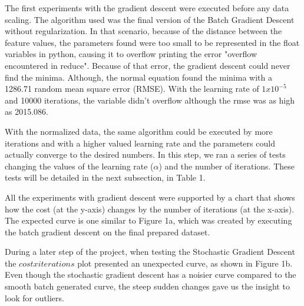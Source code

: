 \documentclass[conference]{IEEEtran}
\begin{document}
    The first experiments with the gradient descent were executed before any data scaling. The algorithm used was the final version of the Batch Gradient Descent without regularization. In that scenario, because of the distance between the feature values, the parameters found were too small to be represented in the float variables in python, causing it to overflow printing the error "overflow encountered in reduce". Because of that error, the gradient descent could never find the minima. Although, the normal equation found the minima with a 1286.71 random mean square error (RMSE). With the learning rate of $1x10^{-5}$ and 10000 iterations, the variable didn't overflow although the rmse was as high as 2015.086.
    
    With the normalized data, the same algorithm could be executed by more iterations and with a higher valued learning rate and the parameters could actually converge to the desired numbers. In this step, we ran a series of tests changing the values of the learning rate ($\alpha$) and the number of iterations. These tests will be detailed in the next subsection, in Table 1.
    
    All the experiments with gradient descent were supported by a chart that shows how the cost (at the y-axis) changes by the number of iterations (at the x-axis). The expected curve is one similar to Figure 1a, which was created by executing the batch gradient descent on the final prepared dataset. 
    
    During a later step of the project, when testing the Stochastic Gradient Descent the $cost x iterations$ plot presented an unexpected curve, as shown in Figure 1b. Even though the stochastic gradient descent has a noisier curve compared to the smooth batch generated curve, the steep sudden changes gave us the insight to look for outliers.
	
\end{document}
